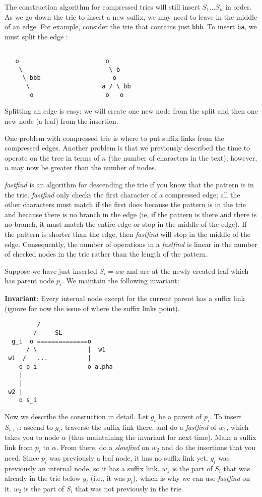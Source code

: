 \documentclass{article}
\begin{document}
The construction algorithm for compressed tries will still insert $S_1
... S_n$ in order.  As we go down the trie to insert a new suffix, we
may need to leave in the middle of an edge.  For example, consider the
trie that contains just \texttt{bbb}.  To insert \texttt{ba}, we must
split the edge :
\begin{verbatim}

   o                        o
    \                        \ b
     \ bbb                    o
      \                    a / \ bb
       o                    o   o
\end{verbatim}
Splitting an edge is easy; we will create one new node from the split
and then one new node (a leaf) from the insertion.  

One problem with compressed trie is where to put suffix links from the
compressed edges.  Another problem is that we previously described the
time to operate on the tree in terms of $n$ (the number of characters in
the text); however, $n$ may now be greater than the number of nodes. 

\emph{fastfind} is an algorithm for descending the trie if you know
that the pattern is in the trie.  \emph{fastfind} only checks the
first character of a compressed edge; all the other characters must
match if the first does because the pattern is in the trie and because
there is no branch in the edge (ie, if the pattern is there and there is
no branch, it must match the entire edge or stop in the middle of the
edge).  If the pattern is shorter than the edge, then \emph{fastfind}
will stop in the middle of the edge.  Consequently, the number of
operations in a \emph{fastfind} is linear in the number of checked
nodes in the trie rather than the length of the pattern.

Suppose we have just inserted $S_i = aw$ and are at the newly created
leaf which has parent node $p_i$.  We maintain the following invariant:

\newpage

\textbf{Invariant}: Every internal node except for the current parent
has a suffix link (ignore for now the issue of where the suffix links
point).

\begin{verbatim}
         /
        /     SL
  g_i  o ==============o
      / \              |  w1
 w1  /   ...           |
    o p_i              o alpha
    |
    |
 w2 |
    o s_i
\end{verbatim}

Now we describe the consruction in detail.  Let $g_i$ be a parent of
$p_i$.  To insert $S_{i+1}$: ascend to $g_i$, traverse the suffix link
there, and do a \emph{fastfind} of $w_1$, which takes you to node
$\alpha$ (thus maintaining the invariant for next time).  Make a
suffix link from $p_i$ to $\alpha$.  From there, do a \emph{slowfind}
on $w_2$ and do the insertions that you need.  Since $p_i$ was
previously a leaf node, it has no suffix link yet.  $g_i$ was
previously an internal node, so it has a suffix link.  $w_1$ is the
part of $S_i$ that was already in the trie below $g_i$ (i.e., it was
$p_i$), which is why we can use \emph{fastfind} on it.  $w_2$ is the
part of $S_i$ that was not previously in the trie.
\end{document}
